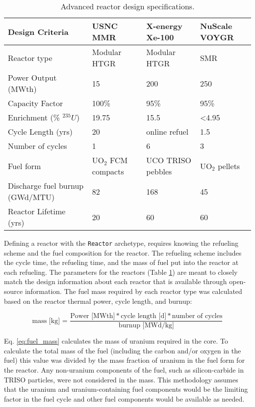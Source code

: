 \begin{table}[ht]
    \centering
    \caption{Advanced reactor design specifications.}
    \label{tab:reactor_summary}
    \renewcommand{\arraystretch}{1.5}
    \begin{tabular}{p{3.5cm}p{3cm}p{3cm}p{3cm}}
        \hline
        Design Criteria & \gls{USNC} \gls{MMR} \cite{noauthor_usnc_2021} & 
        X-energy Xe-100 \cite{mulder_overview_2021} & NuScale VOYGR 
        \cite{nuscale_chapter_2020-1,reyes_nuscale_2021,reyes_correction_2022}\\
        \hline
        Reactor type & Modular HTGR & Modular HTGR & SMR\\
        Power Output (MWth) & 15 & 200  & 250 \\
        Capacity Factor & 100\% & 95\% & 95\% \\
        Enrichment (\% $^{235}U$) & 19.75 & 15.5 & <4.95 \\
        Cycle Length (yrs) & 20 & online refuel & 1.5\\
        Number of cycles & 1 & 6 & 3\\
        Fuel form & UO$_2$ \gls{FCM} compacts & UCO \gls{TRISO} pebbles & UO$_2$ pellets\\
        Discharge fuel burnup (GWd/MTU) & 82 & 168  & 45 \\
        Reactor Lifetime (yrs)& 20 & 60 & 60 \\
        \hline
    \end{tabular}
\end{table}

Defining a reactor with the \Cycamore \texttt{Reactor} archetype, 
requires knowing the refueling scheme and the fuel composition for 
the reactor. The refueling scheme includes 
the cycle time, the refueling time, and the mass of fuel put into the reactor 
at each refueling. The parameters for the reactors (Table \ref{tab:reactor_summary})
are meant to closely match the design information about each reactor that 
is available through open-source information. The fuel mass required by 
each reactor type was calculated based on the reactor thermal power, 
cycle length, and burnup:

\begin{equation}
    \text{mass [kg] = }\frac{\text{Power [MWth]}* \text{cycle 
    length [d]} * \text{number of cycles}}{\text{burnup [MWd/kg]}}
    \label{eq:fuel_mass}
\end{equation}

\noindent Eq. \ref{eq:fuel_mass} calculates the mass of uranium required 
in the core. To calculate the total mass of the fuel (including the carbon 
and/or oxygen in the fuel) this value was divided by the mass fraction of 
uranium in the fuel form for the reactor. Any non-uranium components 
of the fuel, such as silicon-carbide in \gls{TRISO} particles, were 
not considered in the mass. This methodology assumes that the 
uranium and uranium-containing fuel components would be the limiting 
factor in the fuel cycle and other fuel components would be available as 
needed. 

